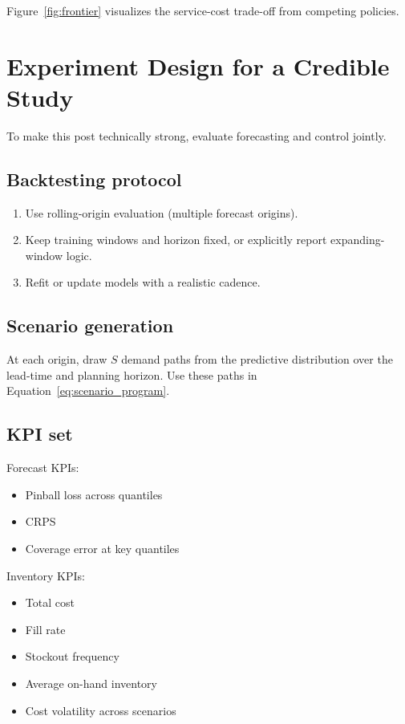 \documentclass[11pt,a4paper]{article}
\begin{document}
Figure~\ref{fig:frontier} visualizes the service-cost trade-off from competing policies.

\section{Experiment Design for a Credible Study}

To make this post technically strong, evaluate forecasting and control jointly.

\subsection{Backtesting protocol}

\begin{enumerate}
    \item Use rolling-origin evaluation (multiple forecast origins).
    \item Keep training windows and horizon fixed, or explicitly report expanding-window logic.
    \item Refit or update models with a realistic cadence.
\end{enumerate}

\subsection{Scenario generation}

At each origin, draw $S$ demand paths from the predictive distribution over the lead-time and planning horizon. Use these paths in Equation~\eqref{eq:scenario_program}.

\subsection{KPI set}

Forecast KPIs:
\begin{itemize}
    \item Pinball loss across quantiles
    \item CRPS
    \item Coverage error at key quantiles
\end{itemize}

Inventory KPIs:
\begin{itemize}
    \item Total cost
    \item Fill rate
    \item Stockout frequency
    \item Average on-hand inventory
    \item Cost volatility across scenarios
\end{itemize}
\end{document}
